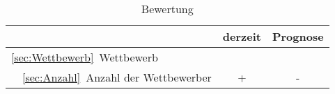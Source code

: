 \begin{table}
  \centering
  \caption{Bewertung}
  \label{table:Bewertung}
  \begin{tabular}{|l|c|c|}
    \hline
    & derzeit & Prognose\\
    \hline
    \ref{sec:Wettbewerb}~Wettbewerb    &                    &\\
    ~~\ref{sec:Anzahl}~Anzahl der Wettbewerber      &  +  & -   \\

    
  \end{tabular}
\end{table}